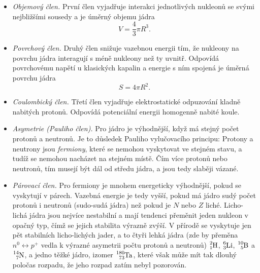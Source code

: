 \documentclass[a4paper,12pt,oneside]{article}
\theoremstyle{red}
\begin{document}
    \begin{itemize}
        \item\emph{Objemový člen.}
            První člen vyjadřuje interakci jednotlivých nukleonů se svými nejbližšími sousedy a je úměrný objemu jádra
            \begin{equation}
                V=\frac{4}{3}\pi R^{3}.
            \end{equation}
    
        \item\emph{Povrchový člen.}
            Druhý člen snižuje vazebnou energii tím, že nukleony na povrchu jádra interagují s méně nukleony než ty uvnitř.
            Odpovídá povrchovému napětí u klasických kapalin a energie s ním spojená je úměrná povrchu jádra
            \begin{equation}
                S=4\pi R^{2}.
            \end{equation}

        \item\emph{Coulombický člen.}
            Třetí člen vyjadřuje elektrostatické odpuzování kladně nabitých protonů.
            Odpovídá potenciální energii homogenně nabité koule.

        \item\emph{Asymetrie (Pauliho člen).}
            Pro jádro je výhodnější, když má stejný počet protonů a neutronů.
            Je to důsledek Pauliho vylučovacího principu: 
            Protony a neutrony jsou \emph{fermiony}, které se nemohou vyskytovat ve stejném stavu, a tudíž se nemohou nacházet na stejném místě.
            Čím více protonů nebo neutronů, tím musejí být dál od středu jádra, a jsou tedy slaběji vázané.

        \item\emph{Párovací člen.}
            Pro fermiony je mnohem energeticky výhodnější, pokud se vyskytují v párech.
            Vazebná energie je tedy vyšší, pokud má jádro sudý počet protonů i neutronů (sudo-sudá jádra) než pokud je $N$ nebo $Z$ liché.
            Licho-lichá jádra jsou nejvíce nestabilní a mají tendenci přeměnit jeden nukleon v opačný typ, čímž se jejich stabilita výrazně zvýší.
            V přírodě se vyskytuje jen pět stabilních licho-lichých jader, a to čtyři lehká jádra (zde by přeměna $n^{0}\leftrightarrow p^{+}$ vedla k výrazné asymetrii počtu protonů a neutronů)
                $\ce{^{2}_{1}H}$, 
                $\ce{^{6}_{3}Li}$, 
                $\ce{^{10}_{5}B}$ a
                $\ce{^{14}_{7}N}$,
            a jedno těžké jádro, izomer $\ce{^{180}_{73}Ta}$, které však může mít tak dlouhý poločas rozpadu, že jeho rozpad zatím nebyl pozorován.
        \end{itemize}
\end{document}
